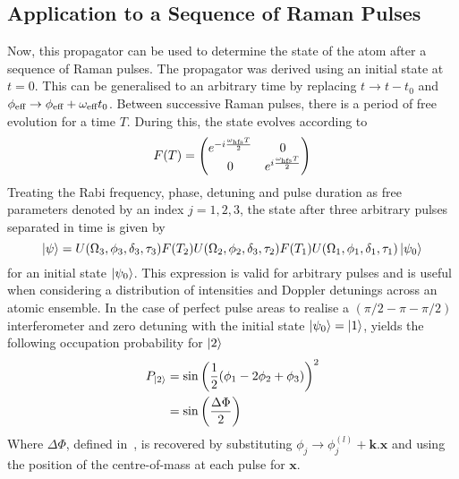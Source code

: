 \subsection{Application to a Sequence of Raman Pulses}
Now, this propagator can be used to determine the state of the atom
after a sequence of Raman pulses. The propagator was derived using an
initial state at $t=0$. This can be generalised to an arbitrary time
by replacing $t\rightarrow t-t_0$ and $\phi_\textnormal{eff} \rightarrow \phi_\textnormal{eff} +
\omega_\textnormal{eff} t_0$. Between successive Raman pulses, there is a period of
free evolution for a time $T$. During this, the state evolves
according to
\begin{equation}
  \label{eq:free_evolution}
  F(T) = \begin{pmatrix} e^{-i \frac{\omega_\textnormal{hfs} T}{2}} &0 \\
  0 & e^{i \frac{\omega_\textnormal{hfs} T}{2}}\end{pmatrix}
\end{equation}
Treating the Rabi frequency, phase, detuning and pulse duration as free
parameters denoted by an index $j=1,2,3$, the state after three arbitrary pulses separated in time
is given by
\begin{equation}
  \label{eq:general_state}
  \ket{\psi} = U(\Omega_3,\phi_3,\delta_3,\tau_3) F(T_2)
  U(\Omega_2,\phi_2,\delta_3,\tau_2) F(T_1)
  U(\Omega_1,\phi_1,\delta_1,\tau_1)
  \ket{\psi_0}
\end{equation}
for an initial state $\ket{\psi_0}$. This expression is valid for
arbitrary pulses and is useful when considering a
distribution of intensities and Doppler detunings across an atomic
ensemble. In the case of perfect pulse areas to realise a
$(\pi/2-\pi-\pi/2)$ interferometer and zero
detuning with the initial state $\ket{\psi_0} =
\ket{1}$,  yields the following
occupation probability for $\ket{2}$
\begin{align}
  \label{eq:state_simp}
  P_{\ket{2}} &= \sin \left(\frac{1}{2} (\phi_1-2
  \phi_2+\phi_3)\right)^2 \nonumber \\
  &= \sin\left(\frac{\Delta \Phi}{2}\right)
\end{align}
Where $\Delta \Phi$, defined
in~, is recovered by substituting 
$\phi_j \rightarrow \phi_j^{(l)} + \textbf{k.x}$ and using the
position of the centre-of-mass at each pulse for $\textbf{x}$.
